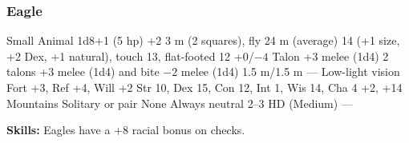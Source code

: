 \subsubsection{Eagle}
\begin{MonsterStats}
{Small Animal}
{1d8+1 (5 hp)}
{+2}
{3 m (2 squares), fly 24 m (average)}
{14 (+1 size, +2 Dex, +1 natural), touch 13, flat-footed 12}
{+0/$-4$}
{Talon +3 melee (1d4)}
{2 talons +3 melee (1d4) and bite $-2$ melee (1d4)}
{1.5 m/1.5 m}
{---}
{Low-light vision}
{Fort +3, Ref +4, Will +2}
{Str 10, Dex 15, Con 12, Int 1, Wis 14, Cha 4}
{ +2,  +14}
{}
{Mountains}
{Solitary or pair}
{\onehalf}
{None}
{Always neutral}
{2--3 HD (Medium)}
{---}
\end{MonsterStats}

\textbf{Skills:} Eagles have a +8 racial bonus on  checks.
